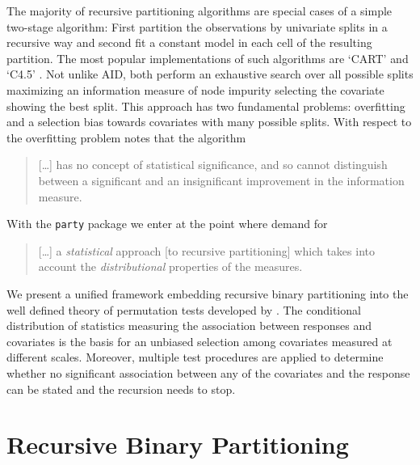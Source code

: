 \documentclass[letter]{article}
\begin{document}
The majority of recursive partitioning algorithms 
are special cases of a simple two-stage algorithm: 
First partition the observations by univariate splits in a recursive way and
second fit a constant model in each cell of the resulting partition.
The most popular implementations of such algorithms are `CART' 
\citep{classifica:1984} and `C4.5' \citep{Quinlan1993}. Not unlike AID,   
both perform an exhaustive search over all possible splits maximizing an
information measure of node impurity selecting the 
covariate showing the best split.
This approach has two fundamental problems: overfitting and a selection 
bias towards covariates with many possible splits. 
With respect to the 
overfitting problem \cite{Mingers1987} notes that the algorithm
\begin{quote}
[\ldots] has no concept of statistical significance, and so cannot
distinguish between a significant and an insignificant improvement in the
information measure.
\end{quote}
With the \texttt{party} package 
we enter at the point where \cite{WhiteLiu1994} demand for
\begin{quote}
[\ldots] a \textit{statistical} approach [to recursive partitioning] which
takes
into account the \textit{distributional} properties of the measures.
\end{quote} 
We present a unified framework embedding recursive binary partitioning into
the well defined theory of permutation tests developed by
\cite{StrasserWeber1999}.
The conditional distribution of statistics measuring the association between
responses and covariates is the basis for an unbiased selection among
covariates measured at different scales. 
Moreover, multiple test procedures are applied to determine whether no
significant
association between any of the covariates and the response can be stated and 
the recursion needs to stop.

\section{Recursive Binary Partitioning \label{algo}}
\end{document}
